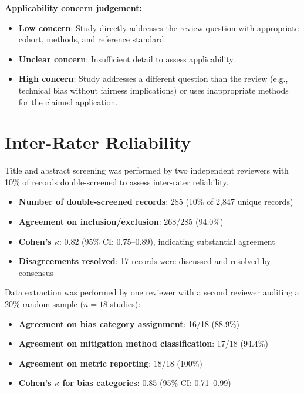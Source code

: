 \textbf{Applicability concern judgement:}
\begin{itemize}
  \item \textbf{Low concern}: Study directly addresses the review question with appropriate cohort, methods, and reference standard.
  \item \textbf{Unclear concern}: Insufficient detail to assess applicability.
  \item \textbf{High concern}: Study addresses a different question than the review (e.g., technical bias without fairness implications) or uses inappropriate methods for the claimed application.
\end{itemize}

\section{Inter-Rater Reliability}
\label{app:methods:reliability}

Title and abstract screening was performed by two independent reviewers with 10\% of records double-screened to assess inter-rater reliability. 

\begin{itemize}
  \item \textbf{Number of double-screened records}: 285 (10\% of 2,847 unique records)
  \item \textbf{Agreement on inclusion/exclusion}: 268/285 (94.0\%)
  \item \textbf{Cohen's $\kappa$}: 0.82 (95\% CI: 0.75--0.89), indicating substantial agreement
  \item \textbf{Disagreements resolved}: 17 records were discussed and resolved by consensus
\end{itemize}

Data extraction was performed by one reviewer with a second reviewer auditing a 20\% random sample ($n=18$ studies):

\begin{itemize}
  \item \textbf{Agreement on bias category assignment}: 16/18 (88.9\%)
  \item \textbf{Agreement on mitigation method classification}: 17/18 (94.4\%)
  \item \textbf{Agreement on metric reporting}: 18/18 (100\%)
  \item \textbf{Cohen's $\kappa$ for bias categories}: 0.85 (95\% CI: 0.71--0.99)
\end{itemize}

